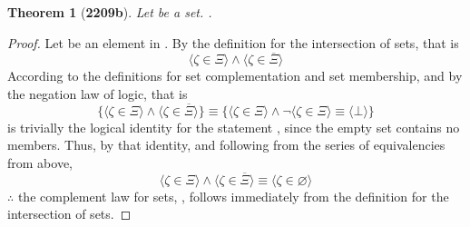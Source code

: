 \documentclass[preview]{standalone}
\newtheorem*{theorem*}{Theorem}
\begin{document}
\begin{theorem*}[\textbf{2209b}] \color{black}
    Let \bm{$\Xi$} be a set. 
    \bm{$\Xi \cap \overline{\Xi} = \varnothing$}.
\end{theorem*}
\begin{proof} \color{black}
    Let \bm{$\zeta$} be an element in \bm{$\Xi \cap \overline{\Xi}$}. 
    By the definition for the intersection of sets, that is
    \begin{equation*}
        \Big \langle \zeta \in \Xi \Big \rangle 
            \land 
        \Big \langle \zeta \in \overline{\Xi} \Big \rangle
    \end{equation*} 
    According to the definitions for set complementation and set membership, 
    and by the negation law of logic, that is
    \begin{equation*}
        \Bigg\{
            \Big \langle \zeta \in \Xi \Big \rangle 
                \land 
            \Big \langle \zeta \in \overline{\Xi} \Big \rangle
        \Bigg\}
            \equiv
        \Bigg\{
            \Big \langle \zeta \in \Xi \Big \rangle 
                \land 
            \lnot \Big \langle \zeta \in \Xi \Big \rangle
                \equiv
            \Big \langle \bot \Big \rangle
        \Bigg\}
    \end{equation*}
    \bm{$\big \langle \bot \big \rangle$} is trivially the logical identity for 
    the statement \bm{$\zeta \in \varnothing$}, 
    since the empty set contains no members. 
    Thus, 
    by that identity, 
    and following from the series of equivalencies from above,
    \begin{equation*}
        \Big \langle \zeta \in \Xi \Big \rangle 
            \land 
        \Big \langle \zeta \in \overline{\Xi} \Big \rangle 
            \equiv
        \Big \langle \zeta \in \varnothing \Big \rangle
    \end{equation*}
    $\therefore$ the complement law for sets, 
    \bm{$\Xi \cap \overline{\Xi} = \varnothing$}, 
    follows immediately from the definition for the intersection of sets.
\color{lightgray} \end{proof}
\end{document}
